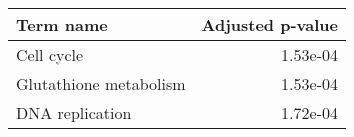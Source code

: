 \begin{tabular}{lr}
\toprule
             Term name &  Adjusted p-value \\
\midrule
            Cell cycle &          1.53e-04 \\
Glutathione metabolism &          1.53e-04 \\
       DNA replication &          1.72e-04 \\
\bottomrule
\end{tabular}

